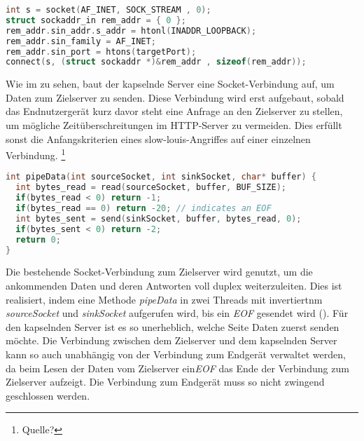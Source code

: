         \begin{lstlisting}[frame=bt, label={lst:socket:create}, language=C, caption=Instanziierung eines Sockets (Servercode in C)]
int s = socket(AF_INET, SOCK_STREAM , 0);
struct sockaddr_in rem_addr = { 0 };
rem_addr.sin_addr.s_addr = htonl(INADDR_LOOPBACK);
rem_addr.sin_family = AF_INET;
rem_addr.sin_port = htons(targetPort);
connect(s, (struct sockaddr *)&rem_addr , sizeof(rem_addr));
        \end{lstlisting}
        Wie im  zu sehen, baut der kapselnde Server eine Socket-Verbindung auf, um Daten zum Zielserver zu senden. Diese Verbindung wird erst aufgebaut, sobald das Endnutzergerät kurz davor steht eine Anfrage an den Zielserver zu stellen, um mögliche Zeitüberschreitungen im HTTP-Server zu vermeiden. Dies erfüllt sonst die Anfangskriterien eines slow-louis-Angriffes auf einer einzelnen Verbindung. \footnote{Quelle?}
        \begin{lstlisting}[frame=bt, label={lst:socket:data}, language=C, caption=Datenweiterleitung durch Sockets (Servercode in C)] 
int pipeData(int sourceSocket, int sinkSocket, char* buffer) {
  int bytes_read = read(sourceSocket, buffer, BUF_SIZE);
  if(bytes_read < 0) return -1;
  if(bytes_read == 0) return -20; // indicates an EOF
  int bytes_sent = send(sinkSocket, buffer, bytes_read, 0);
  if(bytes_sent < 0) return -2;
  return 0;
}
        \end{lstlisting}
        
        Die bestehende Socket-Verbindung zum Zielserver wird genutzt, um die ankommenden Daten und deren Antworten voll duplex weiterzuleiten. Dies ist realisiert, indem eine Methode {\it pipeData} in zwei Threads mit invertiertnm {\it sourceSocket} und {\it sinkSocket} aufgerufen wird, bis ein {\it EOF} gesendet wird (). Für den kapselnden Server ist es so unerheblich, welche Seite Daten zuerst senden möchte. Die Verbindung zwischen dem Zielserver und dem kapselnden Server kann so auch unabhängig von der Verbindung zum Endgerät verwaltet werden, da beim Lesen der Daten vom Zielserver ein{\it EOF} das Ende der Verbindung zum Zielserver aufzeigt. Die Verbindung zum Endgerät muss so nicht zwingend geschlossen werden.
